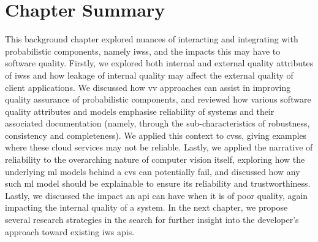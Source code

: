 



\section{Chapter Summary}

This background chapter explored nuances of interacting and integrating with probabilistic components, namely \glspl{iws}, and the impacts this may have to software quality. Firstly, we explored both internal and external quality attributes of \glspl{iws} and how leakage of internal quality may affect the external quality of client applications. We discussed how \gls{vv} approaches can assist in improving quality assurance of probabilistic components, and reviewed how various software quality attributes and models emphasise reliability of systems and their associated documentation (namely, through the sub-characteristics of robustness, consistency and completeness). We applied this context to \glspl{cvs}, giving examples where these cloud services may not be reliable. Lastly, we applied the narrative of reliability to the overarching nature of computer vision itself, exploring how the underlying \gls{ml} models behind a \gls{cvs} can potentially fail, and discussed how any such \gls{ml} model should be explainable to ensure its reliability and trustworthiness. Lastly, we discussed the impact an \gls{api} can have when it is of poor quality, again impacting the internal quality of a system. In the next chapter, we propose several research strategies in the search for further insight into the developer's approach toward existing \gls{iws} \glspl{api}.
